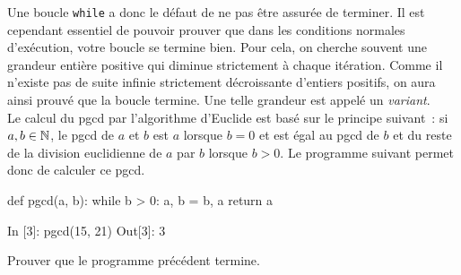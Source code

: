 \documentclass{magnoliaold}
\begin{document}
Une boucle \verb_while_ a donc le défaut de ne pas être assurée de terminer. Il est
cependant essentiel de pouvoir prouver que dans les conditions normales d'exécution, votre boucle se termine bien. Pour cela,
on cherche souvent une grandeur entière positive qui diminue strictement à chaque itération. Comme
il n'existe pas de suite infinie strictement décroissante d'entiers positifs, on aura
ainsi prouvé que la boucle termine. Une telle grandeur est appelé un \emph{variant}.\\

Le calcul du pgcd par l'algorithme d'Euclide est basé sur le principe suivant~:
si $a,b\in\mathbb{N}$, le pgcd de $a$ et $b$ est $a$ lorsque $b=0$ et est égal au pgcd de
$b$ et du reste de la division euclidienne de $a$ par $b$ lorsque $b>0$. Le programme
suivant permet donc de calculer ce pgcd.

\begin{pythoncodeline}
def pgcd(a, b):
    while b > 0:
        a, b = b, a %
    return a
\end{pythoncodeline}

\begin{pythoncode}
In [3]: pgcd(15, 21)
Out[3]: 3
\end{pythoncode}

\begin{exoUnique}
\exo Prouver que le programme précédent termine.
\end{exoUnique}


\end{document}
